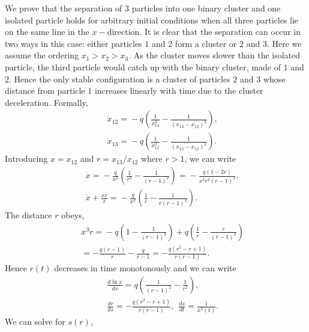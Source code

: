 We prove that the separation of 3 particles into one binary cluster and one isolated particle holds for arbitrary initial conditions when all three particles lie on the same line in the $x-$direction. It is clear that the separation can occur in two ways in this case: either particles $1$ and $2$ form a cluster or $2$ and $3$. Here we assume the ordering $x_1>x_2>x_3$. As the cluster moves slower than the isolated particle, the third particle would catch up with the binary cluster, made of $1$ and $2$. Hence the only stable configuration is a cluster of particles $2$ and $3$ whose distance from particle $1$ increases linearly with time due to the cluster deceleration. Formally,
\begin{eqnarray}&&\!\!\!\!\!\!\!\!\!\!\!\!\!\!\!\!
\dot{x}_{12}\!=\!-q\left(\frac{1}{x_{13}^2}-\frac{1}{(x_{13}-x_{12})^2}\right),\nonumber\\&&\!\!\!\!\!\!\!\!\!\!\!\!\!\!\!\!\!
\dot{x}_{13}\!=\!-q\left(\frac{1}{x_{12}^2}-\frac{1}{(x_{13}-x_{12})^2}\right).\label{s}
\nonumber%
\end{eqnarray}
Introducing $x=x_{12}$ and $r=x_{13}/x_{12}$ where $r>1$, we can write
\begin{eqnarray}&&\!\!\!\!\!\!\!\!\!\!\!\!\!\!\!\!
\dot{x}\!=\!-\frac{q}{x^2}\left(\frac{1}{r^2}-\frac{1}{(r-1)^2}\right)\!=\!-\frac{q\left(1-2r\right)}{x^2 r^2(r-1)^2},\nonumber\\&&\!\!\!\!\!\!\!\!\!\!\!\!\!\!\!\!\!
\dot{x}+\frac{x \dot{r}}{r}\!=\!-\frac{q}{x^2}\left(\frac{1}{r}-\frac{1}{r(r-1)^2}\right).
\end{eqnarray}
The distance $r$ obeys,
\begin{eqnarray}&&\!\!\!\!\!\!\!\!\!\!\!\!\!\!\!\!
x^3\dot{r}\!=\!-q\left(1-\frac{1}{(r-1)^2}\right)+q\left(\frac{1}{r}-\frac{r}{(r-1)^2}\right)\nonumber\\&&\!\!\!\!\!\!\!\!\!\!\!\!\!\!\!\!\!
=-\frac{q(r-1)}{r}-\frac{q}{r-1}=-\frac{q(r^2\!-\!r\!+\!1)}{r(r-1)}.
\end{eqnarray}
Hence $r(t)$ decreases in time monotonously and we can write
\begin{eqnarray}&&\!\!\!\!\!\!\!\!\!\!\!\!\!\!\!\!
\frac{d\ln x}{ds}=q\left(\frac{1}{(r-1)^2}-\frac{1}{r^2}\right),\nonumber\\&&\!\!\!\!\!\!\!\!\!\!\!\!\!\!\!\!\!
\frac{dr}{ds}=-\frac{q(r^2\!-\!r\!+\!1)}{r(r-1)},\ \ \frac{ds}{dt}=\frac{1}{x^3(t)}.
\end{eqnarray}
We can solve for $s(r)$,


